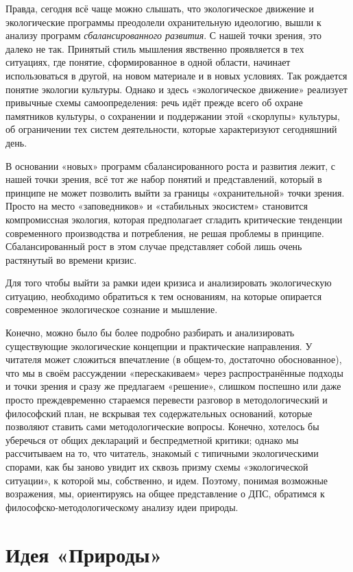 \documentclass[11pt,a4paper]{article}
\begin{document}
Правда, сегодня всё чаще можно слышать, что экологическое движение и
экологические программы преодолели охранительную идеологию, вышли к анализу
программ \emph{сбалансированного развития}. С нашей точки зрения, это далеко
не так.  Принятый стиль мышления явственно проявляется в тех ситуациях, где
понятие, сформированное в одной области, начинает использоваться в другой, на
новом материале и в новых условиях. Так рождается понятие экологии культуры.
Однако и здесь «экологическое движение» реализует привычные схемы
самоопределения: речь идёт прежде всего об охране памятников культуры, о
сохранении и поддержании этой «скорлупы» культуры, об ограничении тех систем
деятельности, которые характеризуют сегодняшний день.

В основании «новых» программ сбалансированного роста и развития лежит, с нашей
точки зрения, всё тот же набор понятий и представлений, который в принципе не
может позволить выйти за границы «охранительной» точки зрения. Просто на место
«заповедников» и «стабильных экосистем» становится компромиссная экология,
которая предполагает сгладить критические тенденции современного производства
и потребления, не решая проблемы в принципе. Сбалансированный рост в этом
случае представляет собой лишь очень растянутый во времени кризис. 

Для того чтобы выйти за рамки идеи кризиса и анализировать экологическую
ситуацию, необходимо обратиться к тем основаниям, на которые опирается
современное экологическое сознание и мышление. 

Конечно, можно было бы более подробно разбирать и анализировать существующие
экологические концепции и практические направления. У читателя может сложиться
впечатление (в общем-то, достаточно обоснованное), что мы в своём рассуждении
«перескакиваем» через распространённые подходы и точки зрения и сразу же
предлагаем «решение», слишком поспешно или даже просто преждевременно
стараемся перевести разговор в методологический и философский план, не
вскрывая тех содержательных оснований, которые позволяют ставить сами
методологические вопросы. Конечно, хотелось бы уберечься от общих деклараций и
беспредметной критики; однако мы рассчитываем на то, что читатель, знакомый с
типичными экологическими спорами, как бы заново увидит их сквозь призму схемы
«экологической ситуации», к которой мы, собственно, и идем. Поэтому, понимая
возможные возражения, мы, ориентируясь на общее представление о ДПС, обратимся
к философско-методологическому анализу идеи природы. 

\section{Идея «Природы»}
\end{document}
